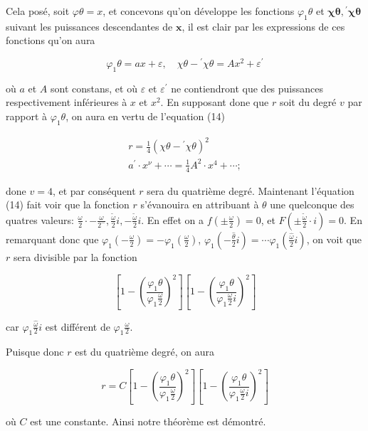 \documentclass{article}
\begin{document}
Cela posé, soit \(\varphi \theta=x\), et concevons qu'on développe les fonctions \(\varphi_{1} \theta\) et \(\boldsymbol{\chi \theta},{ }^{\prime} \boldsymbol{\chi} \boldsymbol{\theta}\) suivant les puissances descendantes de \(\boldsymbol{x}\), il est clair par les expressions de ces fonctions qu'on aura

\[
\varphi_{1} \theta=a x+\varepsilon, \quad \chi \theta-{ }^{\prime} \chi \theta=A x^{2}+\varepsilon^{\prime}
\]

où \(a\) et \(A\) sont constans, et où \(\varepsilon\) et \(\varepsilon^{\prime}\) ne contiendront que des puissances respectivement inférieures à \(x\) et \(x^{2}\). En supposant done que \(r\) soit du degré \(v\) par rapport à \(\varphi_{1} \theta\), on aura en vertu de l'equation (14)

\[
\begin{gathered}
r=\frac{1}{4}\left(\chi \theta-{ }^{\prime} \chi \theta\right)^{2} \\
a^{\prime} \cdot x^{\nu}+\cdots=\frac{1}{4} A^{2} \cdot x^{4}+\cdots ;
\end{gathered}
\]

done \(v=4\), et par conséquent \(r\) sera du quatrième degré. Maintenant l'équation (14) fait voir que la fonction \(r\) s'évanouira en attribuant à \(\theta\) une quelconque des quatres valeurs: \(\frac{\omega}{2} \cdot-\frac{\omega}{2^{-}}, \frac{\tilde{\omega}}{2} i,-\frac{\tilde{\omega}}{2} i\). En effet on a \(f\left( \pm \frac{\omega}{2}\right)=0\), et \(F\left( \pm \frac{\tilde{\omega}}{2} \cdot i\right)=0\). En remarquant donc que \(\varphi_{1}\left(-\frac{\omega}{2}\right)=-\varphi_{1}\left(\frac{\omega}{2}\right)\), \(\varphi_{1}\left(-\frac{\hat{\theta}}{2} i\right)=\cdots \varphi_{1}\left(\frac{\hat{\omega}}{2} i\right)\), on voit que \(r\) sera divisible par la fonction

\[
\left[1-\left(\frac{\varphi_{1} \theta}{\varphi_{1} \frac{\omega}{2}}\right)^{2}\right]\left[1-\left(\frac{\varphi_{1} \theta}{\varphi_{1} \frac{\omega}{2} i}\right)^{2}\right]
\]

car \(\varphi_{1} \frac{\hat{\omega}}{2} i\) est différent de \(\varphi_{1} \frac{\omega}{2}\).

Puisque donc \(r\) est du quatrième degré, on aura

\[
r=C\left[1-\left(\frac{\varphi_{1} \theta}{\varphi_{1} \frac{\omega}{2}}\right)^{2}\right]\left[1-\left(\frac{\varphi_{1} \theta}{\varphi_{1} \frac{\omega}{2} i}\right)^{2}\right]
\]

où \(C\) est une constante. Ainsi notre théorème est démontré.
\end{document}
